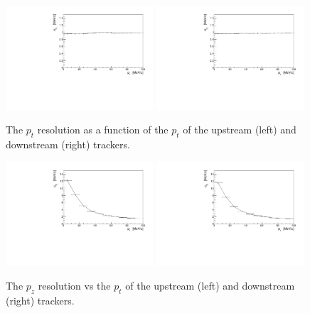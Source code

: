   \begin{figure}[p]
   \begin{center}
     \includegraphics[width=0.49\textwidth, angle=0]{08-Performance/upstream_pt_resolution_pt.pdf}
     \includegraphics[width=0.49\textwidth, angle=0]{08-Performance/downstream_pt_resolution_pt.pdf}
     \caption{\label{fig:PtPtResolKalman} The $p_{t}$ resolution as a function of the $p_{t}$ of the upstream (left) and downstream (right) trackers.}
   \end{center}
  \end{figure}
  
  \begin{figure}[p]
   \begin{center}
     \includegraphics[width=0.49\textwidth, angle=0]{08-Performance/upstream_pz_resolution_pt.pdf}
     \includegraphics[width=0.49\textwidth, angle=0]{08-Performance/downstream_pz_resolution_pt.pdf}
     \caption{\label{fig:PtPzResolKalman} The $p_z$ resolution vs the $p_{t}$ of the upstream (left) and downstream (right) trackers.}
   \end{center}
  \end{figure}
